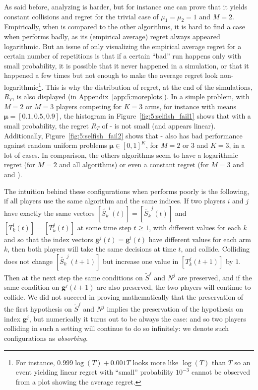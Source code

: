 As said before, analyzing \Selfish{} is harder,
but for instance one can prove that it yields constant
collisions and regret for the trivial case of $\mu_1=\mu_2=1$ and $M=2$.
%
Empirically, when \Selfish{} is compared to the other algorithms,
it is hard to find a case when \Selfish{} performs badly, as its (empirical average) regret always appeared logarithmic.
%
But an issue of only visualizing the empirical average regret for a certain number of repetitions is
that if a certain ``bad'' run happens only with small probability, it is possible that it never happened
in a simulation, or that it happened a few times but not enough to make the average regret look non-logarithmic\footnote{For instance, $0.999 \log(T) + 0.001 T$ looks more like $\log(T)$ than $T$ so an event yielding linear regret with ``small'' probability $10^{-3}$ cannot be observed from a plot showing the average regret.}.
%
This is why the distribution of regret, at the end of the simulations, $R_T$, is also displayed (in Appendix~\ref{app:5:moreplots}).
%
In a simple problem, with $M=2$ or $M=3$ players competing for $K=3$ arms,
for instance with means $\boldsymbol{\mu} = [0.1, 0.5, 0.9]$,
the histogram in Figure~\ref{fig:5:selfish_fail1} shows that with a small probability, the regret $R_T$ of \Selfish-\klUCB{} is not small (and appears linear).
%
%
Additionally, Figure~\ref{fig:5:selfish_fail2} shows that \Selfish-\klUCB{} also has bad performance against random uniform problems $\boldsymbol{\mu}\in[0,1]^K$,
for $M=2$ or $3$ and $K=3$, in a lot of cases.
In comparison, the others algorithms seem to have a logarithmic regret (for $M=2$ and all algorithms)
or even a constant regret (for $M=3$ and \RandTopM{} and \MCTopM).


The intuition behind these configurations when \Selfish{} performs poorly is the following,
if all players use the same algorithm and the same indices.
If two players $i$ and $j$ have exactly the same vectors $[\widetilde{S_k}^i(t)] = [\widetilde{S_k}^j(t)]$
and $[T_k^i(t)] = [T_k^j(t)]$ at some time step $t \geq 1$,
with different values for each $k$
and so that the index vectors $\mathbf{g}^j(t) = \mathbf{g}^{i}(t)$ have different values for each arm $k$,
then both players will take the same decisions at time $t$, and collide.
Colliding does not change $[\widetilde{S_k}^j(t+1)]$ but increase one value in $[T_k^j(t+1)]$ by $1$.
Then at the next step the same conditions on $\widetilde{S}^j$ and $N^j$ are preserved,
and if the same condition on $\mathbf{g}^j(t+1)$ are also preserved,
the two players will continue to collide.
%
We did not succeed in proving mathematically
that the preservation of the first hypothesis on $\widetilde{S}^j$ and $N^j$
implies the preservation of the hypothesis on index $\mathbf{g}^j$,
but numerically it turns out to be always the case:
and so two players colliding in such a setting will continue to do so infinitely:
we denote such configurations as \emph{absorbing}.

